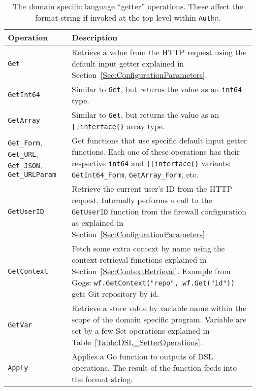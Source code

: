 \begin{table}[h]
\centering

\begin{tabular}{ m{2.5cm} m{11.5cm}  } 
 \hline
 Operation & Description \\ 
 \hline \hline

 \lstinline|Get| & Retrieve a value from the HTTP request using the default input getter explained in Section~\ref{Sec:ConfigurationParameters}. \\ \hline

 \lstinline|GetInt64| & Similar to \lstinline|Get|, but returns the value as an \lstinline|int64| type. \\ \hline

 \lstinline|GetArray| & Similar to \lstinline|Get|, but returns the value as an \lstinline|[]interface{}| array type. \\ \hline

 \lstinline|Get_Form|, \lstinline|Get_URL|, \lstinline|Get_JSON|, \lstinline|Get_URLParam| & Get functions that use specific default input getter functions. Each one of these operations has their respective \lstinline|int64| and \lstinline|[]interface{}| variants: \lstinline|GetInt64_Form|, \lstinline|GetArray_Form|, etc. \\ \hline

 \lstinline|GetUserID| & Retrieve the current user's ID from the HTTP request. Internally performs a call to the \lstinline|GetUserID| function from the firewall configuration as explained in Section~\ref{Sec:ConfigurationParameters}. \\ \hline

 \lstinline|GetContext| & Fetch some extra context by name using the context retrieval functions explained in Section~\ref{Sec:ContextRetrieval}. \newline Example from Gogs: \lstinline|wf.GetContext("repo", wf.Get("id"))| gets Git repository by id. \\ \hline

 \lstinline|GetVar| & Retrieve a store value by variable name within the scope of the domain specific program. Variable are set by a few Set operations explained in Table~\ref{Table:DSL_SetterOperations}. \\ \hline

 \lstinline|Apply| & Applies a Go function to outputs of DSL operations. The result of the function feeds into the format string. \\ \hline

\end{tabular}
\caption{The domain specific language ``getter'' operations. These affect the format string if invoked at the top level within \lstinline|Authn|.}
\label{Table:DSL_GetterOperations}
\end{table}

